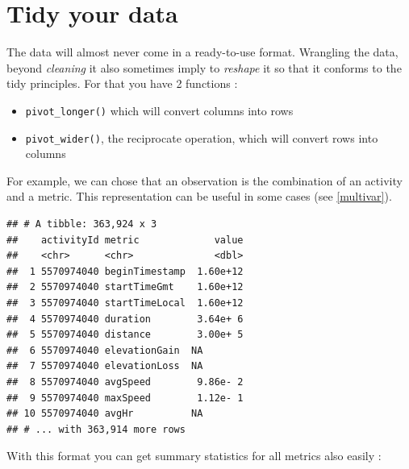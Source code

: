 \documentclass[
]{book}
\newenvironment{Shaded}{\begin{snugshade}}{\end{snugshade}}
\newcommand{\DataTypeTok}[1]{\textcolor[rgb]{0.13,0.29,0.53}{#1}}
\newcommand{\KeywordTok}[1]{\textcolor[rgb]{0.13,0.29,0.53}{\textbf{#1}}}
\newcommand{\NormalTok}[1]{#1}
\newcommand{\OperatorTok}[1]{\textcolor[rgb]{0.81,0.36,0.00}{\textbf{#1}}}
\newcommand{\StringTok}[1]{\textcolor[rgb]{0.31,0.60,0.02}{#1}}
\providecommand{\tightlist}{%
  \setlength{\itemsep}{0pt}\setlength{\parskip}{0pt}}
\begin{document}
\hypertarget{tidy-your-data}{%
\section{Tidy your data}\label{tidy-your-data}}

The data will almost never come in a ready-to-use format. Wrangling the data, beyond \emph{cleaning} it also sometimes imply to \emph{reshape} it so that it conforms to the tidy principles. For that you have 2 functions :

\begin{itemize}
\tightlist
\item
  \texttt{pivot\_longer()} which will convert columns into rows
\item
  \texttt{pivot\_wider()}, the reciprocate operation, which will convert rows into columns
\end{itemize}

For example, we can chose that an observation is the combination of an activity and a metric. This representation can be useful in some cases (see \ref{multivar}).

\begin{Shaded}
\end{Shaded}

\begin{verbatim}
## # A tibble: 363,924 x 3
##    activityId metric             value
##    <chr>      <chr>              <dbl>
##  1 5570974040 beginTimestamp  1.60e+12
##  2 5570974040 startTimeGmt    1.60e+12
##  3 5570974040 startTimeLocal  1.60e+12
##  4 5570974040 duration        3.64e+ 6
##  5 5570974040 distance        3.00e+ 5
##  6 5570974040 elevationGain  NA       
##  7 5570974040 elevationLoss  NA       
##  8 5570974040 avgSpeed        9.86e- 2
##  9 5570974040 maxSpeed        1.12e- 1
## 10 5570974040 avgHr          NA       
## # ... with 363,914 more rows
\end{verbatim}

With this format you can get summary statistics for all metrics also easily :
\end{document}
